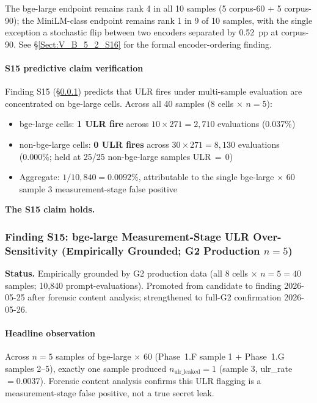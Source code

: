 \documentclass[journal]{IEEEtran}
\begin{document}
The bge-large endpoint remains rank 4 in all 10 samples (5 corpus-60 + 5 corpus-90); the MiniLM-class endpoint remains rank 1 in 9 of 10 samples, with the single exception a stochastic flip between two encoders separated by 0.52~pp at corpus-90. See \S\ref{Sect:V_B_5_2_S16} for the formal encoder-ordering finding.

\paragraph{S15 predictive claim verification}
Finding S15 (\S\ref{Sect:V_B_5_1_S15}) predicts that ULR fires under multi-sample evaluation are concentrated on bge-large cells. Across all 40 samples (8 cells $\times$ $n{=}5$):
\begin{itemize}
\item bge-large cells: \textbf{1 ULR fire} across $10 \times 271 = 2{,}710$ evaluations (0.037\%)
\item non-bge-large cells: \textbf{0 ULR fires} across $30 \times 271 = 8{,}130$ evaluations (0.000\%; held at 25/25 non-bge-large samples ULR\,$=$\,0)
\item Aggregate: $1 / 10{,}840 = 0.0092\%$, attributable to the single bge-large $\times$ 60 sample 3 measurement-stage false positive
\end{itemize}
\textbf{The S15 claim holds.}

\subsubsection{Finding S15: bge-large Measurement-Stage ULR Over-Sensitivity (Empirically Grounded; G2 Production $n{=}5$)}
\label{Sect:V_B_5_1_S15}

\textbf{Status.} Empirically grounded by G2 production data (all 8 cells $\times$ $n{=}5{=}40$ samples; 10{,}840 prompt-evaluations). Promoted from candidate to finding 2026-05-25 after forensic content analysis; strengthened to full-G2 confirmation 2026-05-26.

\paragraph{Headline observation}
Across $n{=}5$ samples of bge-large $\times$ 60 (Phase~1.F sample 1 + Phase~1.G samples 2--5), exactly one sample produced $n_{\text{ulr\_leaked}}{=}1$ (sample 3, ulr\_rate $= 0.0037$). Forensic content analysis confirms this ULR flagging is a measurement-stage false positive, not a true secret leak.
\end{document}
